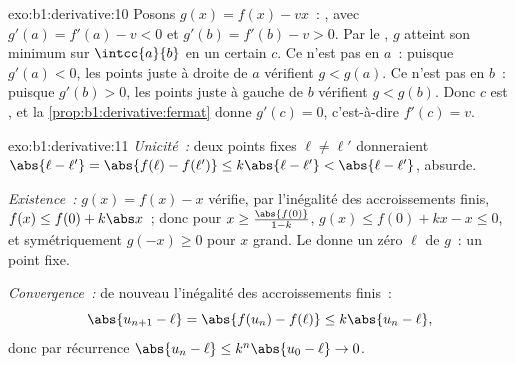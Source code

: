 \begin{solution}{exo:b1:derivative:10}
Posons $g(x) = f(x) - vx$~: , avec $g'(a) = f'(a) - v < 0$
et $g'(b) = f'(b) - v > 0$. Par le , $g$
atteint son minimum sur $\intcc{a}{b}$ en un certain $c$. Ce n'est pas en $a$~:
puisque $g'(a) < 0$, les points juste à droite de $a$ vérifient $g < g(a)$. Ce n'est
pas en $b$~: puisque $g'(b) > 0$, les points juste à gauche de $b$ vérifient $g <
g(b)$. Donc $c$ est , et la \cref{prop:b1:derivative:fermat}
donne $g'(c) = 0$, c'est-à-dire $f'(c) = v$.
\end{solution}

\begin{solution}{exo:b1:derivative:11}
\emph{Unicité~:} deux points fixes $\ell \neq \ell'$ donneraient
$\abs{\ell - \ell'} = \abs{f(\ell) - f(\ell')} \leq k\abs{\ell -
\ell'} < \abs{\ell - \ell'}$, absurde.

\emph{Existence~:} $g(x) = f(x) - x$ vérifie, par l'inégalité des
accroissements finis, $f(x) \leq f(0) + k\abs x$~; donc pour $x \geq
\frac{\abs{f(0)}}{1 - k}$, $g(x) \leq f(0) + kx - x \leq 0$, et
symétriquement $g(-x) \geq 0$ pour $x$ grand. Le  donne un zéro $\ell$ de $g$~: un point fixe.

\emph{Convergence~:} de nouveau l'inégalité des accroissements finis~:
\[
\abs{u_{n+1} - \ell} = \abs{f(u_n) - f(\ell)} \leq k\abs{u_n - \ell},
\]
donc par récurrence $\abs{u_n - \ell} \leq k^n \abs{u_0 - \ell} \to 0$.
\end{solution}


